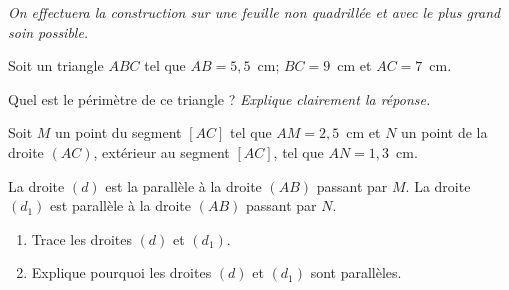 {\em On effectuera la construction sur une feuille non quadrillée et
  avec le plus grand soin possible.}
\begin{myenumerate}
\item Soit un triangle $ABC$ tel que $AB=5,5$~cm; $BC=9$~cm et
$AC=7$~cm.
\item Quel est le périmètre de ce triangle ? {\em Explique clairement
    la réponse.}
\item Soit $M$ un point du segment $[AC]$ tel que $AM=2,5$~cm et $N$
un point de la droite $(AC)$, extérieur au segment $[AC]$, tel que
$AN=1,3$~cm.
\item La droite $(d)$ est la parallèle à la droite $(AB)$ passant par
$M$. La droite $(d_1)$ est
parallèle à la droite $(AB)$ passant par $N$.
\begin{enumerate}
\item Trace les droites $(d)$ et $(d_1)$.
\item Explique pourquoi les droites $(d)$ et $(d_1)$ sont parallèles.
\end{enumerate}
\end{myenumerate}